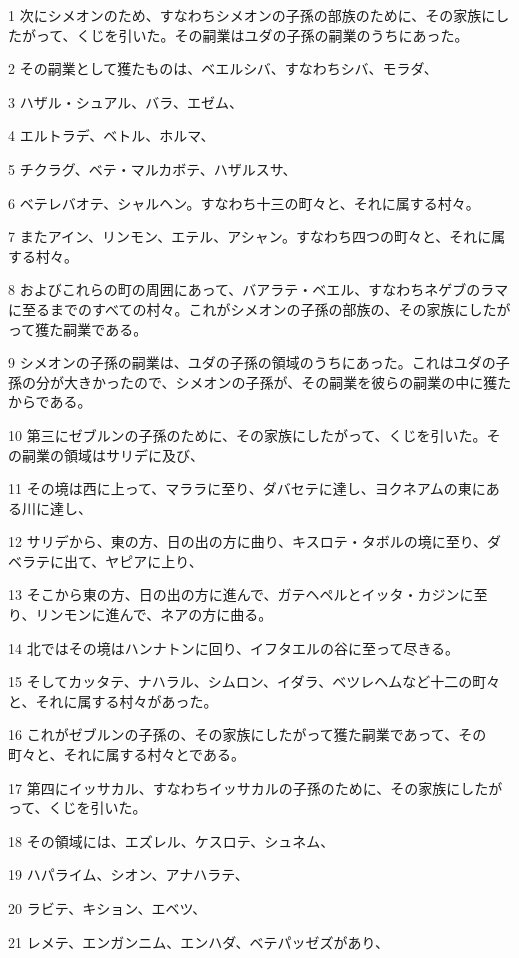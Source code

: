 \par 1 次にシメオンのため、すなわちシメオンの子孫の部族のために、その家族にしたがって、くじを引いた。その嗣業はユダの子孫の嗣業のうちにあった。
\par 2 その嗣業として獲たものは、ベエルシバ、すなわちシバ、モラダ、
\par 3 ハザル・シュアル、バラ、エゼム、
\par 4 エルトラデ、ベトル、ホルマ、
\par 5 チクラグ、ベテ・マルカボテ、ハザルスサ、
\par 6 ベテレバオテ、シャルヘン。すなわち十三の町々と、それに属する村々。
\par 7 またアイン、リンモン、エテル、アシャン。すなわち四つの町々と、それに属する村々。
\par 8 およびこれらの町の周囲にあって、バアラテ・ベエル、すなわちネゲブのラマに至るまでのすべての村々。これがシメオンの子孫の部族の、その家族にしたがって獲た嗣業である。
\par 9 シメオンの子孫の嗣業は、ユダの子孫の領域のうちにあった。これはユダの子孫の分が大きかったので、シメオンの子孫が、その嗣業を彼らの嗣業の中に獲たからである。
\par 10 第三にゼブルンの子孫のために、その家族にしたがって、くじを引いた。その嗣業の領域はサリデに及び、
\par 11 その境は西に上って、マララに至り、ダバセテに達し、ヨクネアムの東にある川に達し、
\par 12 サリデから、東の方、日の出の方に曲り、キスロテ・タボルの境に至り、ダベラテに出て、ヤピアに上り、
\par 13 そこから東の方、日の出の方に進んで、ガテヘペルとイッタ・カジンに至り、リンモンに進んで、ネアの方に曲る。
\par 14 北ではその境はハンナトンに回り、イフタエルの谷に至って尽きる。
\par 15 そしてカッタテ、ナハラル、シムロン、イダラ、ベツレヘムなど十二の町々と、それに属する村々があった。
\par 16 これがゼブルンの子孫の、その家族にしたがって獲た嗣業であって、その町々と、それに属する村々とである。
\par 17 第四にイッサカル、すなわちイッサカルの子孫のために、その家族にしたがって、くじを引いた。
\par 18 その領域には、エズレル、ケスロテ、シュネム、
\par 19 ハパライム、シオン、アナハラテ、
\par 20 ラビテ、キション、エベツ、
\par 21 レメテ、エンガンニム、エンハダ、ベテパッゼズがあり、
